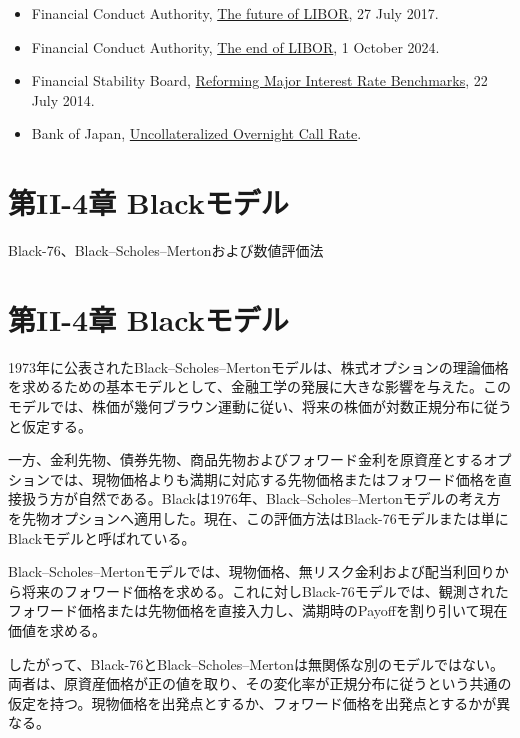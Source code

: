 \documentclass[
  letterpaper,
  DIV=11,
  numbers=noendperiod]{scrreprt}
\providecommand{\tightlist}{%
  \setlength{\itemsep}{0pt}\setlength{\parskip}{0pt}}
\begin{document}
\begin{itemize}
\tightlist
\item
  Financial Conduct Authority,
  \href{https://www.fca.org.uk/news/speeches/the-future-of-libor}{The
  future of LIBOR}, 27 July 2017.
\item
  Financial Conduct Authority,
  \href{https://www.fca.org.uk/news/press-releases/end-libor}{The end of
  LIBOR}, 1 October 2024.
\item
  Financial Stability Board,
  \href{https://www.fsb.org/2014/07/r_140722/}{Reforming Major Interest
  Rate Benchmarks}, 22 July 2014.
\item
  Bank of Japan,
  \href{https://www.boj.or.jp/en/statistics/market/short/mutan/index.htm}{Uncollateralized
  Overnight Call Rate}.
\end{itemize}

\chapter{第II-4章
Blackモデル}\label{ux7b2cii-4ux7ae0-blackux30e2ux30c7ux30eb}

Black-76、Black--Scholes--Mertonおよび数値評価法

\hfill\break

\chapter{第II-4章
Blackモデル}\label{ux7b2cii-4ux7ae0-blackux30e2ux30c7ux30eb-1}

1973年に公表されたBlack--Scholes--Mertonモデルは、株式オプションの理論価格を求めるための基本モデルとして、金融工学の発展に大きな影響を与えた。このモデルでは、株価が幾何ブラウン運動に従い、将来の株価が対数正規分布に従うと仮定する。

一方、金利先物、債券先物、商品先物およびフォワード金利を原資産とするオプションでは、現物価格よりも満期に対応する先物価格またはフォワード価格を直接扱う方が自然である。Blackは1976年、Black--Scholes--Mertonモデルの考え方を先物オプションへ適用した。現在、この評価方法はBlack-76モデルまたは単にBlackモデルと呼ばれている。

Black--Scholes--Mertonモデルでは、現物価格、無リスク金利および配当利回りから将来のフォワード価格を求める。これに対しBlack-76モデルでは、観測されたフォワード価格または先物価格を直接入力し、満期時のPayoffを割り引いて現在価値を求める。

したがって、Black-76とBlack--Scholes--Mertonは無関係な別のモデルではない。両者は、原資産価格が正の値を取り、その変化率が正規分布に従うという共通の仮定を持つ。現物価格を出発点とするか、フォワード価格を出発点とするかが異なる。
\end{document}
